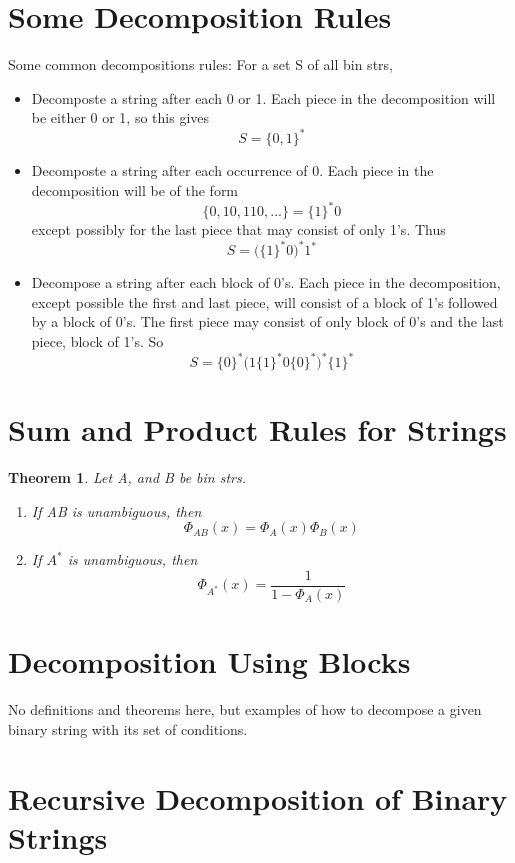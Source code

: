\documentclass[11pt, oneside]{book}
\theoremstyle{break}
\newtheorem{thm}{Theorem}[section]
\begin{document}
\section{Some Decomposition Rules}
Some common decompositions rules: For a set S of all bin strs,
\begin{itemize}
	\item Decomposte a string after each 0 or 1. Each piece in the decomposition will be either 0 or 1, so this gives
	\[
		S = \{0, 1\}^*
	\]
	\item Decomposte a string after each occurrence of 0. Each piece in the decomposition will be of the form
	\[
		\{0, 10, 110, ...\} = \{1\}^* 0
	\]
	except possibly for the last piece that may consist of only 1's. Thus
	\[
		S = \Big(\{1\}^*0\Big)^*{1}^*
	\]
	\item Decompose a string after each block of 0's. Each piece in the decomposition, except possible the first and last piece, will consist of a block of 1's followed by a block of 0's. The first piece may consist of only block of 0's and the last piece, block of 1's. So
	\[
		S = \{0\}^*\Big(1\{1\}^*0\{0\}^*\Big)^*\{1\}^*
	\]
\end{itemize}


\section{Sum and Product Rules for Strings}

\begin{thm}
	Let A, and B be bin strs.
	\begin{enumerate}
		\item If AB is unambiguous, then
			\[
				\Phi_{AB}(x) = \Phi_{A}(x) \Phi_{B}(x)
			\]
		\item If $A^*$ is unambiguous, then
			\[
				\Phi_{A^*}(x) = \frac{1}{1-\Phi_{A}(x)}
			\]
	\end{enumerate}
\end{thm}


\section{Decomposition Using Blocks}

No definitions and theorems here, but examples of how to decompose a given binary string with its set of conditions.


\section{Recursive Decomposition of Binary Strings}
\end{document}
